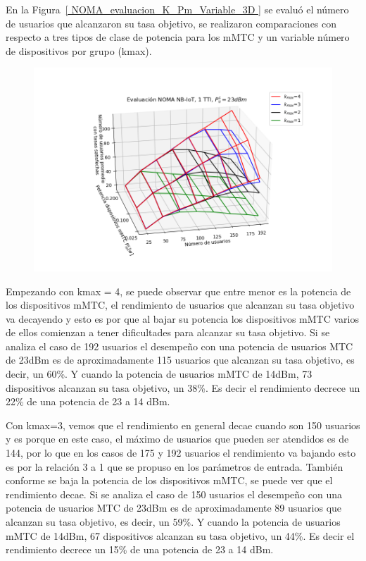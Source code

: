 En la Figura~\ref{ NOMA_evaluacion_K_Pm_Variable_3D } se evaluó el número de usuarios que alcanzaron su tasa objetivo, se realizaron comparaciones con respecto a tres tipos de clase de potencia para los mMTC y un variable número de dispositivos por grupo (kmax).\newline

\begin{figure}[th]
    \centering
    \includegraphics[scale=.7]{Figures/ResultadosNOMA/NOMA_evaluacion_K_Pm_Variable_3D.png}
    \decoRule
    \caption[]{}
    \label{fig:NOMA_evaluacion_K_Pm_Variable_3D}
\end{figure}

Empezando con kmax = 4, se puede observar que entre menor es la potencia de los dispositivos mMTC, el rendimiento de usuarios que alcanzan su tasa objetivo va decayendo y esto es por que al bajar su potencia los dispositivos mMTC varios de ellos comienzan a tener dificultades para alcanzar su tasa objetivo. Si se analiza el caso de 192 usuarios el desempeño con una potencia de usuarios MTC de 23dBm es de aproximadamente 115 usuarios que alcanzan su tasa objetivo, es decir, un 60\%. Y cuando la potencia de usuarios mMTC de 14dBm, 73 dispositivos alcanzan su tasa objetivo, un 38\%. Es decir el rendimiento decrece un 22\% de una potencia de 23 a 14 dBm.\newline

Con kmax=3, vemos que el rendimiento en general decae cuando son 150 usuarios y es porque en este caso, el máximo de usuarios que pueden ser atendidos es de 144, por lo que en los casos de 175 y 192 usuarios el rendimiento va bajando esto es por la relación 3 a 1 que se propuso en los parámetros de entrada. También conforme se baja la potencia de los dispositivos mMTC, se puede ver que el rendimiento decae. Si se analiza el caso de 150 usuarios el desempeño con una potencia de usuarios MTC de 23dBm es de aproximadamente 89 usuarios que alcanzan su tasa objetivo, es decir, un 59\%. Y cuando la potencia de usuarios mMTC de 14dBm, 67 dispositivos alcanzan su tasa objetivo, un 44\%. Es decir el rendimiento decrece un 15\% de una potencia de 23 a 14 dBm.\newline

